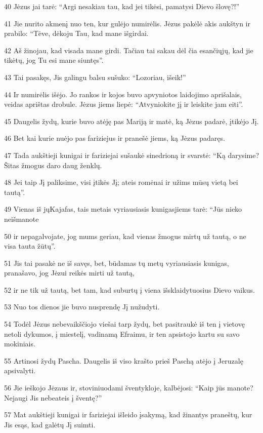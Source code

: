 \par 40 Jėzus jai tarė: “Argi nesakiau tau, kad jei tikėsi, pamatysi Dievo šlovę?!” 
\par 41 Jie nurito akmenį nuo ten, kur gulėjo numirėlis. Jėzus pakėlė akis aukštyn ir prabilo: “Tėve, dėkoju Tau, kad mane išgirdai. 
\par 42 Aš žinojau, kad visada mane girdi. Tačiau tai sakau dėl čia esančiųjų, kad jie tikėtų, jog Tu esi mane siuntęs”. 
\par 43 Tai pasakęs, Jis galingu balsu sušuko: “Lozoriau, išeik!” 
\par 44 Ir numirėlis išėjo. Jo rankos ir kojos buvo apvyniotos laidojimo aprišalais, veidas aprištas drobule. Jėzus jiems liepė: “Atvyniokite jį ir leiskite jam eiti”. 
\par 45 Daugelis žydų, kurie buvo atėję pas Mariją ir matė, ką Jėzus padarė, įtikėjo Jį. 
\par 46 Bet kai kurie nuėjo pas fariziejus ir pranešė jiems, ką Jėzus padaręs. 
\par 47 Tada aukštieji kunigai ir fariziejai sušaukė sinedrioną ir svarstė: “Ką darysime? Šitas žmogus daro daug ženklų. 
\par 48 Jei taip Jį paliksime, visi įtikės Jį; ateis romėnai ir užims mūsų vietą bei tautą”. 
\par 49 Vienas iš jų­Kajafas, tais metais vyriausiasis kunigas­jiems tarė: “Jūs nieko neišmanote 
\par 50 ir nepagalvojate, jog mums geriau, kad vienas žmogus mirtų už tautą, o ne visa tauta žūtų”. 
\par 51 Jis tai pasakė ne iš savęs, bet, būdamas tų metų vyriausiasis kunigas, pranašavo, jog Jėzui reikės mirti už tautą, 
\par 52 ir ne tik už tautą, bet tam, kad suburtų į viena išsklaidytuosius Dievo vaikus. 
\par 53 Nuo tos dienos jie buvo nusprendę Jį nužudyti. 
\par 54 Todėl Jėzus nebevaikščiojo viešai tarp žydų, bet pasitraukė iš ten į vietovę netoli dykumos, į miestelį, vadinamą Efraimu, ir ten apsistojo kartu su savo mokiniais. 
\par 55 Artinosi žydų Pascha. Daugelis iš viso krašto prieš Paschą atėjo į Jeruzalę apsivalyti. 
\par 56 Jie ieškojo Jėzaus ir, stoviniuodami šventykloje, kalbėjosi: “Kaip jūs manote? Nejaugi Jis nebeateis į šventę?” 
\par 57 Mat aukštieji kunigai ir fariziejai išleido įsakymą, kad žinantys praneštų, kur Jis esąs, kad galėtų Jį suimti.


